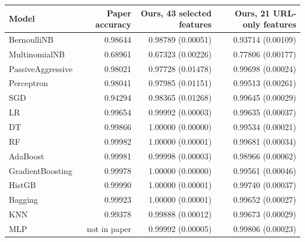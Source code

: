 {\footnotesize
\begin{tabular}{lrrr}
\toprule
\textbf{Model} & \textbf{Paper accuracy} & \textbf{Ours, 43 selected features} & \textbf{Ours, 21 URL-only features} \\
\midrule
BernoulliNB & 0.98644 & 0.98789 (0.00051) & 0.93714 (0.00109) \\
MultinomialNB & 0.68961 & 0.67323 (0.00226) & 0.77806 (0.00177) \\
PassiveAggressive & 0.98021 & 0.97728 (0.01478) & 0.99698 (0.00024) \\
Perceptron & 0.98041 & 0.97985 (0.01151) & 0.99513 (0.00261) \\
SGD & 0.94294 & 0.98365 (0.01268) & 0.99645 (0.00029) \\
LR & 0.99654 & 0.99992 (0.00003) & 0.99635 (0.00037) \\
DT & 0.99866 & 1.00000 (0.00000) & 0.99534 (0.00021) \\
RF & 0.99982 & 1.00000 (0.00001) & 0.99681 (0.00034) \\
AdaBoost & 0.99981 & 0.99998 (0.00003) & 0.98966 (0.00062) \\
GradientBoosting & 0.99978 & 1.00000 (0.00000) & 0.99561 (0.00046) \\
HistGB & 0.99990 & 1.00000 (0.00001) & 0.99740 (0.00037) \\
Bagging & 0.99923 & 1.00000 (0.00001) & 0.99652 (0.00027) \\
KNN & 0.99378 & 0.99888 (0.00012) & 0.99673 (0.00029) \\
MLP & not in paper & 0.99992 (0.00005) & 0.99806 (0.00023) \\
\bottomrule
\end{tabular}
}
